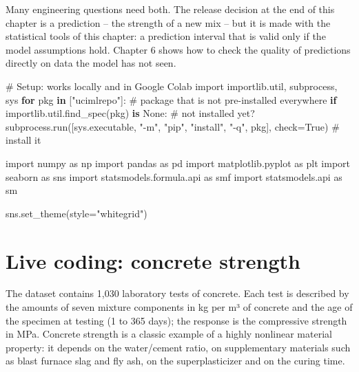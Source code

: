 \documentclass[
  letterpaper,
  DIV=11,
  numbers=noendperiod]{scrreprt}
\newenvironment{Shaded}{\begin{snugshade}}{\end{snugshade}}
\newcommand{\CommentTok}[1]{\textcolor[rgb]{0.37,0.37,0.37}{#1}}
\newcommand{\ControlFlowTok}[1]{\textcolor[rgb]{0.00,0.23,0.31}{\textbf{#1}}}
\newcommand{\ImportTok}[1]{\textcolor[rgb]{0.00,0.46,0.62}{#1}}
\newcommand{\KeywordTok}[1]{\textcolor[rgb]{0.00,0.23,0.31}{\textbf{#1}}}
\newcommand{\NormalTok}[1]{\textcolor[rgb]{0.00,0.23,0.31}{#1}}
\newcommand{\OperatorTok}[1]{\textcolor[rgb]{0.37,0.37,0.37}{#1}}
\newcommand{\StringTok}[1]{\textcolor[rgb]{0.13,0.47,0.30}{#1}}
\newcommand{\VariableTok}[1]{\textcolor[rgb]{0.07,0.07,0.07}{#1}}
\begin{document}
Many engineering questions need both. The release decision at the end of
this chapter is a prediction -- the strength of a new mix -- but it is
made with the statistical tools of this chapter: a prediction interval
that is valid only if the model assumptions hold. Chapter 6 shows how to
check the quality of predictions directly on data the model has not
seen.

\begin{Shaded}
\begin{Highlighting}[]
\CommentTok{\# Setup: works locally and in Google Colab}
\ImportTok{import}\NormalTok{ importlib.util, subprocess, sys}
\ControlFlowTok{for}\NormalTok{ pkg }\KeywordTok{in}\NormalTok{ [}\StringTok{"ucimlrepo"}\NormalTok{]:                       }\CommentTok{\# package that is not pre{-}installed everywhere}
    \ControlFlowTok{if}\NormalTok{ importlib.util.find\_spec(pkg) }\KeywordTok{is} \VariableTok{None}\NormalTok{:   }\CommentTok{\# not installed yet?}
\NormalTok{        subprocess.run([sys.executable, }\StringTok{"{-}m"}\NormalTok{, }\StringTok{"pip"}\NormalTok{, }\StringTok{"install"}\NormalTok{, }\StringTok{"{-}q"}\NormalTok{, pkg], check}\OperatorTok{=}\VariableTok{True}\NormalTok{)  }\CommentTok{\# install it}

\ImportTok{import}\NormalTok{ numpy }\ImportTok{as}\NormalTok{ np}
\ImportTok{import}\NormalTok{ pandas }\ImportTok{as}\NormalTok{ pd}
\ImportTok{import}\NormalTok{ matplotlib.pyplot }\ImportTok{as}\NormalTok{ plt}
\ImportTok{import}\NormalTok{ seaborn }\ImportTok{as}\NormalTok{ sns}
\ImportTok{import}\NormalTok{ statsmodels.formula.api }\ImportTok{as}\NormalTok{ smf}
\ImportTok{import}\NormalTok{ statsmodels.api }\ImportTok{as}\NormalTok{ sm}

\NormalTok{sns.set\_theme(style}\OperatorTok{=}\StringTok{"whitegrid"}\NormalTok{)}
\end{Highlighting}
\end{Shaded}

\section{Live coding: concrete
strength}\label{live-coding-concrete-strength}

The dataset contains 1,030 laboratory tests of concrete. Each test is
described by the amounts of seven mixture components in kg per m³ of
concrete and the age of the specimen at testing (1 to 365 days); the
response is the compressive strength in MPa. Concrete strength is a
classic example of a highly nonlinear material property: it depends on
the water/cement ratio, on supplementary materials such as blast furnace
slag and fly ash, on the superplasticizer and on the curing time.
\end{document}
